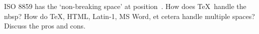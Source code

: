 ISO 8859 has the `non-breaking space' at position~. How
does \TeX\ handle the nbsp? How do \TeX, HTML, Latin-1, MS Word, et
cetera handle multiple spaces? Discuss the pros and cons.
